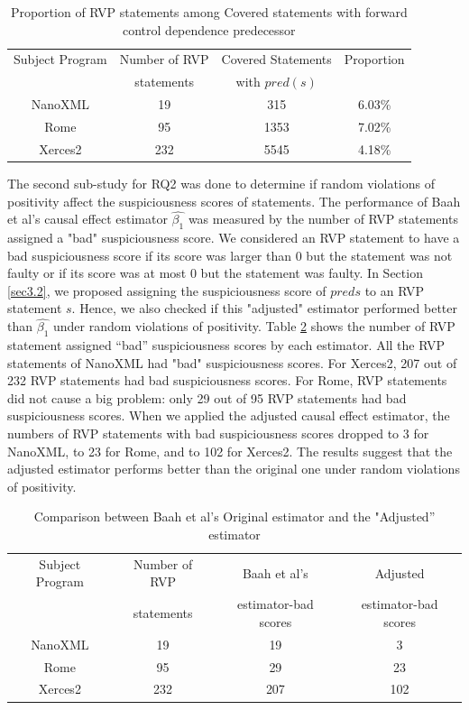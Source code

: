 \begin{table}
\caption{Proportion of RVP statements among Covered statements with forward control dependence predecessor}\label{table2}
\centering
\begin{tabular}{|c|c|c|c|}
\hline
Subject Program	&	Number of RVP	&	Covered Statements	&	Proportion	\\ 
 & statements & with $pred(s)$ &\\\hline
NanoXML	&	19&	315	&	6.03\%	\\ \hline
Rome 	&	95	&	1353	&	7.02\%	\\ \hline
Xerces2 &	232	&	5545	&	4.18\%	\\ \hline

\end{tabular}
\end{table}

The second sub-study for RQ2 was done to determine if random violations of positivity affect the suspiciousness scores of statements.  The performance of Baah et al’s causal effect estimator $\widehat{\beta_1}$ was measured by the number of RVP statements assigned a "bad" suspiciousness score.  We considered an RVP statement to have a bad suspiciousness score if its score was larger than 0 but the statement was not faulty or if its score was at most 0 but the statement was faulty.  In Section \ref{sec3.2}, we proposed assigning the suspiciousness score of $pred{s}$ to an RVP statement $s$.  Hence, we also checked if this "adjusted" estimator performed better than $\widehat{\beta_1}$ under random violations of positivity.  Table \ref{table3} shows the number of RVP statement assigned “bad” suspiciousness scores by each estimator.  All the RVP statements of NanoXML had "bad" suspiciousness scores.  For Xerces2, 207 out of 232 RVP statements had bad suspiciousness scores.  For Rome, RVP statements did not cause a big problem: only 29 out of 95 RVP statements had bad suspiciousness scores.  When we applied the adjusted causal effect estimator, the numbers of RVP statements with bad suspiciousness scores dropped to 3 for NanoXML, to 23 for Rome, and to 102 for Xerces2.  The results suggest that the adjusted estimator performs better than the original one under random violations of positivity.
\begin{table}
\caption{Comparison between Baah et al’s  Original estimator and the "Adjusted” estimator}\label{table3}
\centering
\begin{tabular}{|c|c|c|c|}
\hline
Subject Program	&	Number of RVP	&	Baah et al’s	&	Adjusted	\\ 
 & statements & estimator-bad scores &estimator-bad scores\\\hline
NanoXML	&	19&	19	&	3	\\ \hline
Rome 	&	95	&	29	&	23	\\ \hline
Xerces2 &	232	&	207	&	102	\\ \hline

\end{tabular}
\end{table}

